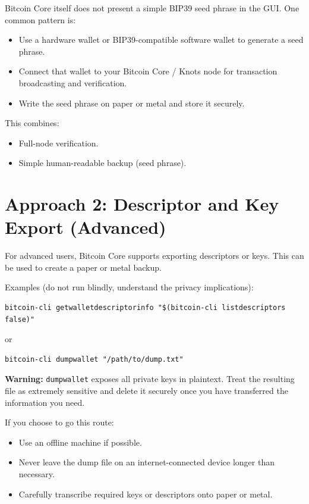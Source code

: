 \documentclass[12pt,a4paper]{book}
\begin{document}
Bitcoin Core itself does not present a simple BIP39 seed phrase in the GUI. One common pattern is:
\begin{itemize}
  \item Use a hardware wallet or BIP39-compatible software wallet to generate a seed phrase.
  \item Connect that wallet to your Bitcoin Core / Knots node for transaction broadcasting and verification.
  \item Write the seed phrase on paper or metal and store it securely.
\end{itemize}

This combines:
\begin{itemize}
  \item Full-node verification.
  \item Simple human-readable backup (seed phrase).
\end{itemize}

\section{Approach 2: Descriptor and Key Export (Advanced)}

For advanced users, Bitcoin Core supports exporting descriptors or keys. This can be used to create a paper or metal backup.

Examples (do not run blindly, understand the privacy implications):

\begin{lstlisting}[style=bashstyle]
bitcoin-cli getwalletdescriptorinfo "$(bitcoin-cli listdescriptors false)"
\end{lstlisting}

or

\begin{lstlisting}[style=bashstyle]
bitcoin-cli dumpwallet "/path/to/dump.txt"
\end{lstlisting}

\textbf{Warning:} \texttt{dumpwallet} exposes all private keys in plaintext. Treat the resulting file as extremely sensitive and delete it securely once you have transferred the information you need.

If you choose to go this route:
\begin{itemize}
  \item Use an offline machine if possible.
  \item Never leave the dump file on an internet-connected device longer than necessary.
  \item Carefully transcribe required keys or descriptors onto paper or metal.
\end{itemize}
\end{document}
